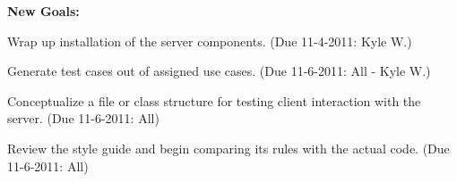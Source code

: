 \documentclass[12pt]{article}
\newenvironment{itemize*}%
  {\begin{itemize}%
  	\setlength{\parsep}{0pt}
    \setlength{\itemsep}{0pt}%
    \setlength{\parskip}{0pt}}%
  {\end{itemize}}
\begin{document}
\textbf{New Goals:}\\
\begin{itemize*}
\item Wrap up installation of the server components. (Due 11-4-2011: Kyle W.)
\item Generate test cases out of assigned use cases. (Due 11-6-2011: All - Kyle W.)
\item Conceptualize a file or class structure for testing client interaction with the server. (Due 11-6-2011: All)
\item Review the style guide and begin comparing its rules with the actual code. (Due 11-6-2011: All)
\end{itemize*}
\end{document}
